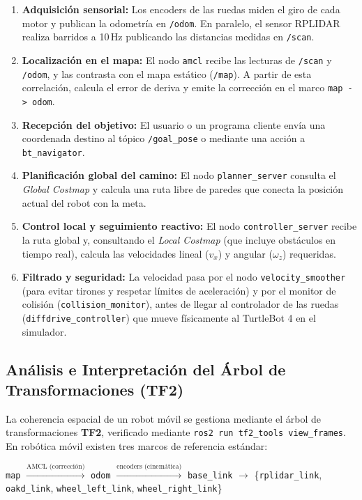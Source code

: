 \documentclass[11pt,a4paper]{article}
\begin{document}
\begin{enumerate}
    \item \textbf{Adquisición sensorial:} Los encoders de las ruedas miden el giro de cada motor y publican la odometría en \texttt{/odom}. En paralelo, el sensor RPLIDAR realiza barridos a 10\,Hz publicando las distancias medidas en \texttt{/scan}.
    \item \textbf{Localización en el mapa:} El nodo \texttt{amcl} recibe las lecturas de \texttt{/scan} y \texttt{/odom}, y las contrasta con el mapa estático (\texttt{/map}). A partir de esta correlación, calcula el error de deriva y emite la corrección en el marco \texttt{map -> odom}.
    \item \textbf{Recepción del objetivo:} El usuario o un programa cliente envía una coordenada destino al tópico \texttt{/goal\_pose} o mediante una acción a \texttt{bt\_navigator}.
    \item \textbf{Planificación global del camino:} El nodo \texttt{planner\_server} consulta el \textit{Global Costmap} y calcula una ruta libre de paredes que conecta la posición actual del robot con la meta.
    \item \textbf{Control local y seguimiento reactivo:} El nodo \texttt{controller\_server} recibe la ruta global y, consultando el \textit{Local Costmap} (que incluye obstáculos en tiempo real), calcula las velocidades lineal ($v_x$) y angular ($\omega_z$) requeridas.
    \item \textbf{Filtrado y seguridad:} La velocidad pasa por el nodo \texttt{velocity\_smoother} (para evitar tirones y respetar límites de aceleración) y por el monitor de colisión (\texttt{collision\_monitor}), antes de llegar al controlador de las ruedas (\texttt{diffdrive\_controller}) que mueve físicamente al TurtleBot 4 en el simulador.
\end{enumerate}

\subsection{Análisis e Interpretación del Árbol de Transformaciones (TF2)}

La coherencia espacial de un robot móvil se gestiona mediante el árbol de transformaciones \textbf{TF2}, verificado mediante \texttt{ros2 run tf2\_tools view\_frames}. En robótica móvil existen tres marcos de referencia estándar:

\begin{center}
\small
\texttt{map} $\xrightarrow{\text{AMCL (corrección)}}$ \texttt{odom} $\xrightarrow{\text{encoders (cinemática)}}$ \texttt{base\_link} $\longrightarrow$ \{\texttt{rplidar\_link}, \texttt{oakd\_link}, \texttt{wheel\_left\_link}, \texttt{wheel\_right\_link}\}
\end{center}
\end{document}
